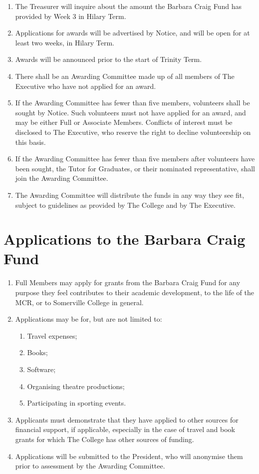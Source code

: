 \documentclass[11pt, a4paper]{article}
\begin{document}
\begin{enumerate}
    \item The Treasurer will inquire about the amount the Barbara Craig Fund has provided by Week 3 in Hilary Term.
    \item Applications for awards will be advertised by Notice, and will be open for at least two weeks, in Hilary Term.
    \item Awards will be announced prior to the start of Trinity Term.
    \item There shall be an Awarding Committee made up of all members of The Executive who have not applied for an award.
    \item If the Awarding Committee has fewer than five members, volunteers shall be sought by Notice.  Such volunteers must not have applied for an award, and may be either Full or Associate Members.  Conflicts of interest must be disclosed to The Executive, who reserve the right to decline volunteership on this basis.
    \item If the Awarding Committee has fewer than five members after volunteers have been sought, the Tutor for Graduates, or their nominated representative, shall join the Awarding Committee.
    \item The Awarding Committee will distribute the funds in any way they see fit, subject to guidelines as provided by The College and by The Executive.
\end{enumerate}





\section{Applications to the Barbara Craig Fund}
\label{sec:applications}

\begin{enumerate}
    \item Full Members may apply for grants from the Barbara Craig Fund for any purpose they feel contributes to their academic development, to the life of the MCR, or to Somerville College in general.
    \item Applications may be for, but are not limited to:
    \begin{enumerate}
        \item Travel expenses;
        \item Books;
        \item Software;
        \item Organising theatre productions;
        \item Participating in sporting events.
    \end{enumerate}
    \item Applicants must demonstrate that they have applied to other sources for financial support, if applicable, especially in the case of travel and book grants for which The College has other sources of funding.
    \item Applications will be submitted to the President, who will anonymise them prior to  assessment by the Awarding Committee.
\end{enumerate}
\end{document}
